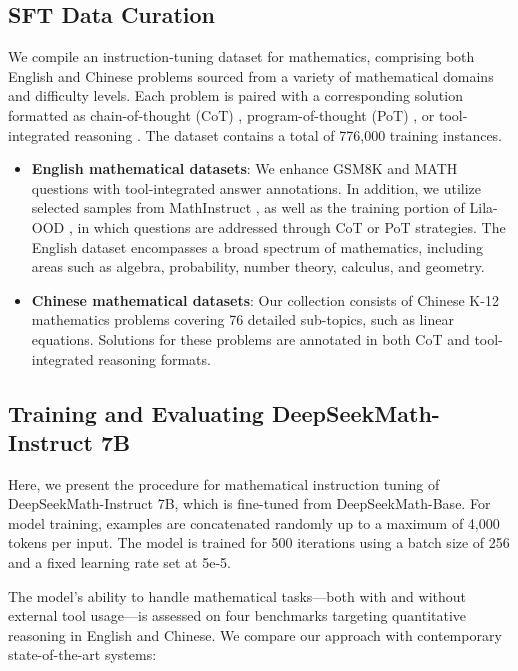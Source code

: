 \subsection{SFT Data Curation}

We compile an instruction-tuning dataset for mathematics, comprising both English and Chinese problems sourced from a variety of mathematical domains and difficulty levels. Each problem is paired with a corresponding solution formatted as chain-of-thought (CoT) \citep{cot}, program-of-thought (PoT) \citep{pot,pal}, or tool-integrated reasoning \citep{tora}. The dataset contains a total of 776,000 training instances.

\begin{itemize}[topsep=0pt]
    \item \textbf{English mathematical datasets}: We enhance GSM8K and MATH questions with tool-integrated answer annotations. In addition, we utilize selected samples from MathInstruct \citep{MathInstruct}, as well as the training portion of Lila-OOD \citep{lila}, in which questions are addressed through CoT or PoT strategies. The English dataset encompasses a broad spectrum of mathematics, including areas such as algebra, probability, number theory, calculus, and geometry.
    \item \textbf{Chinese mathematical datasets}: Our collection consists of Chinese K-12 mathematics problems covering 76 detailed sub-topics, such as linear equations. Solutions for these problems are annotated in both CoT and tool-integrated reasoning formats.
\end{itemize}

\subsection{Training and Evaluating DeepSeekMath-Instruct 7B}

Here, we present the procedure for mathematical instruction tuning of DeepSeekMath-Instruct 7B, which is fine-tuned from DeepSeekMath-Base. For model training, examples are concatenated randomly up to a maximum of 4,000 tokens per input. The model is trained for 500 iterations using a batch size of 256 and a fixed learning rate set at 5e-5.

The model's ability to handle mathematical tasks—both with and without external tool usage—is assessed on four benchmarks targeting quantitative reasoning in English and Chinese. We compare our approach with contemporary state-of-the-art systems:

